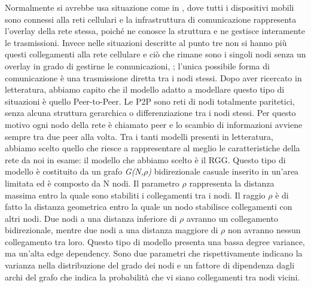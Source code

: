 Normalmente si avrebbe usa situazione come in , dove tutti i dispositivi mobili sono connessi alla reti cellulari e la infrastruttura di comunicazione rappresenta l'overlay della rete stessa, poiché ne conosce la struttura e ne gestisce interamente le trasmissioni. Invece nelle situazioni descritte al punto tre non si hanno più questi collegamenti alla rete cellulare e ciò che rimane sono i singoli nodi senza un overlay in grado di gestirne le comunicazioni, ; l'unica possibile forma di comunicazione è una trasmissione diretta tra i nodi stessi. Dopo aver ricercato in letteratura, abbiamo capito che il modello adatto a modellare questo tipo di situazioni è quello Peer-to-Peer. Le \acs{P2P} sono reti di nodi totalmente paritetici, senza alcuna struttura gerarchica o differenziazione tra i nodi stessi. Per questo motivo ogni nodo della rete è chiamato peer e lo scambio di informazioni avviene sempre tra due peer alla volta. Tra i tanti modelli presenti in letteratura, abbiamo scelto quello che riesce a rappresentare al meglio le caratteristiche della rete da noi in esame: il modello che abbiamo scelto è il \acf{RGG}. Questo tipo di modello è costituito da un grafo \textit{G(N,$\rho$)} bidirezionale casuale inserito in un'area limitata ed è composto da N nodi. Il parametro $\rho$ rappresenta la distanza massima entro la quale sono stabiliti i collegamenti tra i nodi. Il raggio $\rho$ è di fatto la distanza geometrica entro la quale un nodo stabilisce collegamenti con altri nodi. Due nodi a una distanza inferiore di $\rho$ avranno un collegamento bidirezionale, mentre due nodi a una distanza maggiore di $\rho$ non avranno nessun collegamento tra loro. Questo tipo di modello presenta una bassa degree variance, ma un'alta edge dependency. Sono due parametri che rispettivamente indicano la varianza nella distribuzione del grado dei nodi e un fattore di dipendenza dagli archi del grafo che indica la probabilità che vi siano collegamenti tra nodi vicini.

